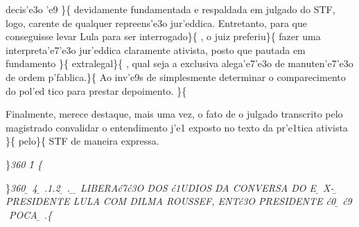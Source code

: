decis'e3o 'e9 \}\{\rtlch{}  \ltrch{}
 devidamente fundamentada e
respaldada em julgado do STF, logo, carente de qualquer repreens'e3o
jur'eddica. Entretanto, para que conseguisse levar Lula para ser
interrogado\}\{\rtlch{}  \ltrch{}  , o
juiz preferiu\}\{ \rtlch{}  \ltrch{}
 fazer uma interpreta'e7'e3o
jur'eddica claramente ativista, posto que pautada em fundamento
\}\{\rtlch{}  \ltrch{} 
extralegal\}\{\rtlch{}  \ltrch{}
 , qual seja a exclusiva
alega'e7'e3o de manuten'e7'e3o de ordem p'fablica.\}\{\rtlch{} 
\ltrch{}  Ao inv'e9s de simplesmente determinar o
comparecimento do pol'ed tico para prestar depoimento. \}\{\rtlch{}
 \ltrch{} 
\par \tab Finalmente, merece destaque, mais uma vez, o fato de o julgado
transcrito pelo magistrado convalidar o entendimento j'e1 exposto no
texto da pr'e1tica ativista \}\{\rtlch{}  \ltrch{}
 pelo\}\{\rtlch{}  \ltrch{}
 STF de maneira expressa.
\par \}\pard\plain \ltrpar\qj {}\sl360\widctlpar\wrapdefault\faauto{} \rtlch{}  \ltrch{} \f1\cgrid{} \{\rtlch{}
 \ltrch{} 
\par \}\pard \ltrpar\qj {}\sl360\widctlpar\wrapdefault\faauto{} {\rtlch{} \ab{} \ltrch{} \b{} 4}{\rtlch{} \ab{} \ltrch{} 
\b{} .1.2}{\rtlch{} \ab{} \ltrch{} \b{} .}{\rtlch{} \ab{} \ltrch{} \b{}  }{\rtlch{} \ab{} \ltrch{} 
\b{} LIBERA\'c7\'c3O DOS \'c1UDIOS DA CONVERSA DO E}{\rtlch{} \ab{} \ltrch{} \b{} X-}{\rtlch{} \ab{} \ltrch{} \b{} 
PRESIDENTE LULA COM DILMA ROUSSEF, ENT\'c3O PRESIDENTE \'c0 }{\rtlch{} \ab{} \ltrch{} \b{} \'c9}{\rtlch{} \ab{} \ltrch{} \b{} POCA}{\rtlch{} 
\ab{} \ltrch{} \b{} .}\{\rtlch{}

